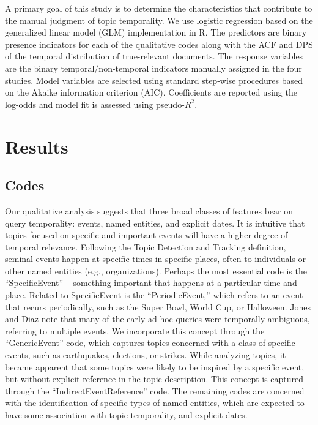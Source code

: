 \documentclass{sig-alternate}
\begin{document}
A primary goal of this study is to determine the characteristics that contribute to the manual judgment of topic temporality. We use logistic regression based on the generalized linear model (GLM) implementation in R. The predictors are binary presence indicators for each of the qualitative codes along with the ACF and DPS of the temporal distribution of true-relevant documents.  The response variables are the binary temporal/non-temporal indicators manually assigned in the four studies.  Model variables are selected using standard step-wise procedures based on the Akaike information criterion (AIC). Coefficients are reported using the log-odds and model fit is assessed using pseudo-$R^2$.

\section{Results}


\subsection{Codes}

Our qualitative analysis suggests that three broad classes of features bear on query temporality: events, named entities, and explicit dates. It is intuitive that topics focused on specific and important events will have a higher degree of temporal relevance. Following the Topic Detection and Tracking definition, seminal events happen at specific times in specific places, often to individuals or other named entities (e.g., organizations). Perhaps the most essential code is the ``SpecificEvent'' -- something important that happens at a particular time and place. Related to SpecificEvent is the ``PeriodicEvent,'' which refers to an event that recurs periodically, such as the Super Bowl, World Cup, or Halloween. Jones and Diaz \cite{Jones2007} note that many of the early ad-hoc queries were temporally ambiguous, referring to multiple events. We incorporate this concept through the ``GenericEvent'' code, which captures topics concerned with a class of specific events, such as earthquakes, elections, or strikes. While analyzing topics, it became apparent that some topics were likely to be inspired by a specific event, but without explicit reference in the topic description. This concept is captured through the ``IndirectEventReference'' code. The remaining codes are concerned with the identification of specific types of named entities, which are expected to have some  association with topic temporality, and explicit dates.
\end{document}
